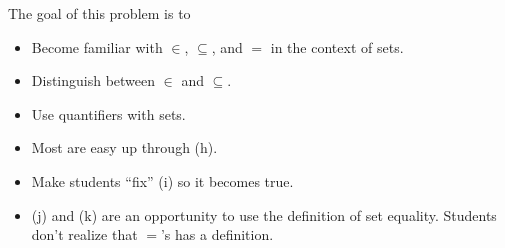	\question
	\begin{annotation}
		\begin{goals}

			The goal of this problem is to
			\begin{itemize}
				\item Become familiar with $\in$, $\subseteq$, and $=$ in
					the context of sets.
				\item Distinguish between $\in$ and $\subseteq$.
				\item Use quantifiers with sets.
			\end{itemize}
		\end{goals}

		\begin{notes}
			\begin{itemize}
				\item Most are easy up through (h).
				\item Make students ``fix'' (i) so it
					becomes true.
				\item (j) and (k) are an opportunity to use
					the definition of set equality. Students don't
					realize that $=$'s has a definition.
			\end{itemize}
		\end{notes}
	\end{annotation}
